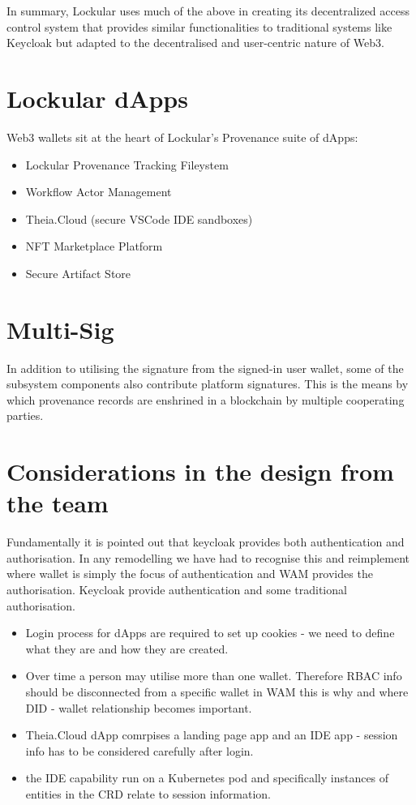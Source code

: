 \documentclass{tufte-handout}
\begin{document}
In summary, Lockular uses much of the above in creating its decentralized access control system that provides similar functionalities to traditional
systems like Keycloak but adapted to the decentralised and user-centric nature of Web3.

 \section{Lockular dApps}\label{sec:page-layout}
 Web3 wallets sit at the heart of Lockular's Provenance suite of dApps:
 \begin{itemize}
    \item Lockular Provenance Tracking Fileystem
    \item Workflow Actor Management
    \item Theia.Cloud (secure VSCode IDE sandboxes)
    \item NFT Marketplace Platform
    \item Secure Artifact Store
 \end{itemize}

 \section{Multi-Sig}\label{sec:page-layout}
 In addition to utilising the signature from the signed-in user wallet, some of the subsystem components also contribute platform signatures. This
 is the means by which provenance records are enshrined in a blockchain by multiple cooperating parties.

 \section{Considerations in the design from the team}
 Fundamentally it is pointed out that keycloak provides both authentication and authorisation. In any remodelling we have had to recognise this and
 reimplement where wallet is simply the focus of authentication and WAM provides the authorisation. Keycloak provide authentication and
 some traditional authorisation.
 \begin{itemize}
    \item Login process for dApps are required to set up cookies - we need to define what they are and how they are created.
    \item Over time a person may utilise more than one wallet. Therefore RBAC info should be disconnected from a specific wallet in WAM
    this is why and where DID - wallet relationship becomes important.
    \item Theia.Cloud dApp comrpises a landing page app and an IDE app - session info has to be considered carefully after login.
    \item the IDE capability run on a Kubernetes pod and specifically instances of entities in the CRD relate to session information.
 \end{itemize}


\end{document}
